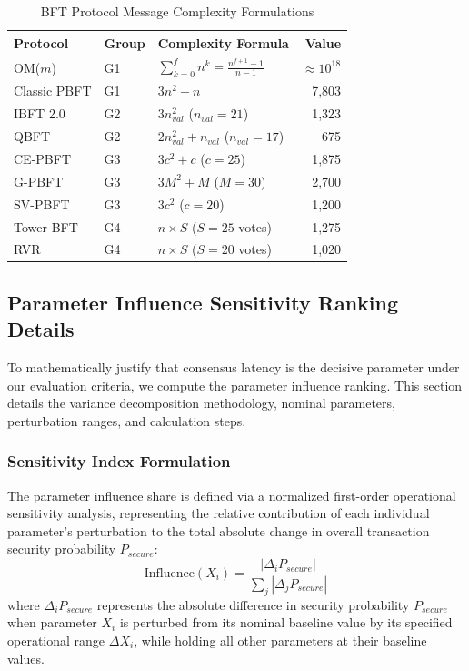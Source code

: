 \documentclass[10pt,twocolumn,letterpaper]{article}
\begin{document}
\begin{table}[htbp]
\caption{BFT Protocol Message Complexity Formulations}
\label{tab:message_formulas}
\centering
\scriptsize
\begin{tabular}{@{}llp{2.5cm}r@{}}
\toprule
\textbf{Protocol} & \textbf{Group} & \textbf{Complexity Formula} & \textbf{Value} \\
\midrule
OM($m$) & G1 & $\sum_{k=0}^{f} n^k = \frac{n^{f+1}-1}{n-1}$ & $\approx 10^{18}$ \\
Classic PBFT & G1 & $3n^2 + n$ & 7,803 \\
IBFT 2.0 & G2 & $3n_{val}^2$ ($n_{val}=21$) & 1,323 \\
QBFT & G2 & $2n_{val}^2 + n_{val}$ ($n_{val}=17$) & 675 \\
CE-PBFT & G3 & $3c^2 + c$ ($c=25$) & 1,875 \\
G-PBFT & G3 & $3M^2 + M$ ($M=30$) & 2,700 \\
SV-PBFT & G3 & $3c^2$ ($c=20$) & 1,200 \\
Tower BFT & G4 & $n \times S$ ($S=25$ votes) & 1,275 \\
RVR & G4 & $n \times S$ ($S=20$ votes) & 1,020 \\
\bottomrule
\end{tabular}
\end{table}

\subsection{Parameter Influence Sensitivity Ranking Details}
To mathematically justify that consensus latency is the decisive parameter under our evaluation criteria, we compute the parameter influence ranking. This section details the variance decomposition methodology, nominal parameters, perturbation ranges, and calculation steps.

\subsubsection{Sensitivity Index Formulation}
The parameter influence share is defined via a normalized first-order operational sensitivity analysis, representing the relative contribution of each individual parameter's perturbation to the total absolute change in overall transaction security probability $P_{secure}$:
\begin{equation}
\text{Influence}(X_i) = \frac{|\Delta_i P_{secure}|}{\sum_{j} |\Delta_j P_{secure}|}
\label{eq:sens_influence_comp}
\end{equation}
where $\Delta_i P_{secure}$ represents the absolute difference in security probability $P_{secure}$ when parameter $X_i$ is perturbed from its nominal baseline value by its specified operational range $\Delta X_i$, while holding all other parameters at their baseline values.
\end{document}

